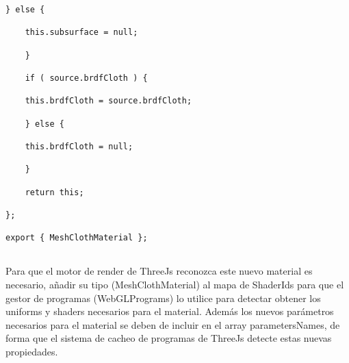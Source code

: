 \begin{lstlisting}[caption=Clase MeshClothMaterial]
    } else {

    this.subsurface = null;

    }

    if ( source.brdfCloth ) {

    this.brdfCloth = source.brdfCloth;

    } else {

    this.brdfCloth = null;

    }

    return this;

};

export { MeshClothMaterial };
        
    \end{lstlisting}
    
    Para que el motor de render de ThreeJs reconozca este nuevo material es necesario, a\~nadir
    su tipo (MeshClothMaterial) al mapa de ShaderIds para que el gestor de programas (WebGLPrograms)
    lo utilice para detectar obtener los uniforms y shaders necesarios para el material. Adem\'as
    los nuevos par\'ametros necesarios para el material se deben de incluir en el array
    parametersNames, de forma que el sistema de cacheo de programas de ThreeJs detecte estas
    nuevas propiedades.\newline
    
